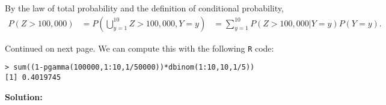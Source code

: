 \documentclass{stat_homework}
\begin{document}

\begin{solution}
  By the law of total probability and the definition of conditional probability, 
  \begin{align*}
    P(Z>100,000) 
    &= P(\bigcup_{y=1}^{10} Z>100,000,Y=y)
    &= \sum_{y=1}^{10} P(Z>100,000|Y=y)P(Y=y).
  \end{align*}

  Continued on next page.
\newpage 
  We can compute this with the following \texttt{R} code:
\begin{verbatim}
> sum((1-pgamma(100000,1:10,1/50000))*dbinom(1:10,10,1/5))
[1] 0.4019745
\end{verbatim}
\end{solution}


\textbf{Solution:}
\end{document}
